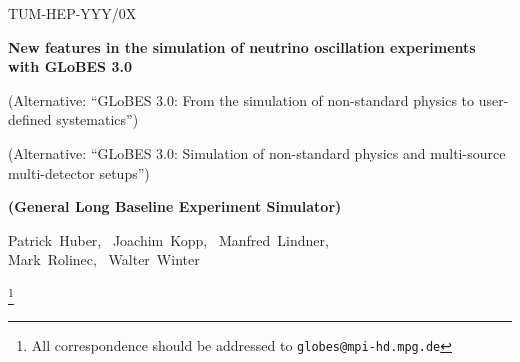 \documentclass[12pt,a4paper]{article}
\begin{document}

\begin{titlepage}

\renewcommand{\thefootnote}{\alph{footnote}}

\vspace*{-3.cm}
\begin{flushright}
TUM-HEP-YYY/0X\\
\end{flushright}

\vspace*{0.5cm}

\renewcommand{\thefootnote}{\fnsymbol{footnote}}
\setcounter{footnote}{-1}

{\begin{center}
{\Large\bf New features in the simulation of neutrino oscillation experiments with GLoBES 3.0}

(Alternative: ``GLoBES 3.0: From the simulation of non-standard physics to user-defined systematics'')

(Alternative: ``GLoBES 3.0: Simulation of non-standard physics and multi-source multi-detector
setups'')

\end{center}}
{\begin{center}
{\large\bf (General Long Baseline Experiment Simulator)}
\end{center}}
\renewcommand{\thefootnote}{\alph{footnote}}

\vspace*{.8cm}
{\begin{center} {\large{\sc
                Patrick~Huber\footnotemark[1],~
                Joachim~Kopp\footnotemark[2],~
                Manfred~Lindner\footnotemark[2], \\
                Mark~Rolinec\footnotemark[3],~
                Walter~Winter\footnotemark[4]
                }}

\footnote{All correspondence should be addressed to {\tt globes@mpi-hd.mpg.de}}

\end{center}}
\vspace*{0cm}
{\it
\begin{center}


\end{center}}
\end{titlepage}
\end{document}

